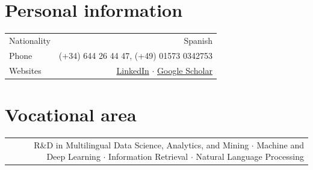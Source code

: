 \documentclass[10pt]{article}
\begin{document}
\section*{Personal information}
\begin{tabular}{L!{\VRule}R}
Nationality&Spanish\vspace{5pt}\\
Phone& (+34) 644 26 44 47, (+49) 01573 0342753 \vspace{5pt}\\
Websites& \href{https://www.linkedin.com/in/marfrasa/en/}{LinkedIn} $\cdot$ \href{http://scholar.google.com/citations?user=tjhy5T8AAAAJ}{Google Scholar} \\
\end{tabular}

\section*{Vocational area}
\begin{tabular}{L!{\VRule}R}
&R\&D in Multilingual Data Science, Analytics, and Mining $\cdot$ Machine and Deep Learning $\cdot$ Information Retrieval $\cdot$ Natural Language Processing \vspace{5pt}\\
\end{tabular}
\end{document}
